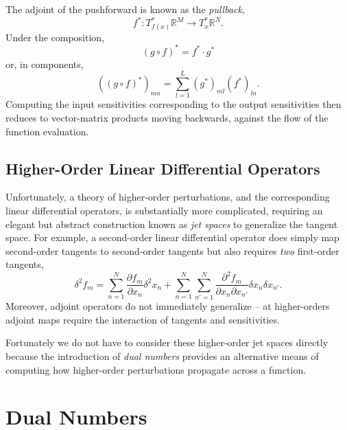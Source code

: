The adjoint of the pushforward is known as the \textit{pullback},
%
\begin{equation*}
f^{*} : T^{*}_{f (x) } \mathbb{R}^{M} \rightarrow T^{*}_{x} \mathbb{R}^{N}.
\end{equation*}
%
Under the composition,
%
\begin{equation*}
\left( g \circ f \right)^{*} = f^{*} \cdot g^{*}
\end{equation*}
%
or, in components,
%
\begin{equation*}
\left( \left( g \circ f \right)^{*} \right)_{mn} = 
\sum_{l = 1}^{L} \left( g^{*} \right)_{ml} \left( f^{*} \right)_{ln}.
\end{equation*}
%
Computing the input sensitivities corresponding to the output sensitivities then reduces
to vector-matrix products moving backwards, against the flow of the function evaluation.

\subsection{Higher-Order Linear Differential Operators}

Unfortunately, a theory of higher-order perturbations, and the corresponding
linear differential operators, is substantially more complicated, requiring an elegant but
abstract construction known as \textit{jet spaces} to generalize the tangent space.  
For example, a second-order linear differential operator does simply map second-order 
tangents to second-order tangents but also requires \textit{two} first-order tangents,
%
 \begin{equation*}
\delta^{2} f_{m} 
= \sum_{n = 1}^{N} \frac{ \partial f_{m} }{ \partial x_{n} } \delta^{2} x_{n} 
+ \sum_{n = 1}^{N} \sum_{n' = 1}^{N} 
\frac{ \partial^{2} f_{m} }{ \partial x_{n} \partial x_{n'} } 
\delta x_{n} \delta x_{n'}.
\end{equation*}
%
Moreover, adjoint operators do not immediately generalize -- at higher-orders adjoint
maps require the interaction of tangents and sensitivities.

Fortunately we do not have to consider these higher-order jet spaces directly
because the introduction of \textit{dual numbers} provides an alternative means
of computing how higher-order perturbations propagate across a function.

\section{Dual Numbers}

